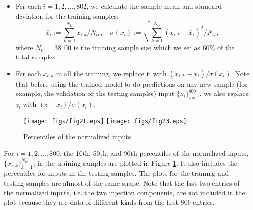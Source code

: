 \documentclass[thmsa,onecolumn,12pt]{article}%
\begin{document}
\begin{itemize}
\item For each $i=1,2,...,802$, we calculate the sample mean and standard deviation for the training samples:
\[\bar{x}_i:=\sum_{k=1}^{N_{tr}}x_{i,k}/{N_{tr}}, \quad \sigma(x_i):= \sqrt{\sum_{k=1}^{N_{tr}}(x_{i,k}-\bar{x}_i)^2/{N_{tr}}},\]
where $N_{tr}=38100$ is the training sample size which we set as $60\%$ of the total samples.
\item For each $x_{i,k}$ in all the training, we replace it with $(x_{i,k}-\bar{x}_i)/\sigma(x_i)$. Note that before using the trained model to do predictions on any new sample (for example, the validation or the testing samples)  input $\{z_i\}_{i=1}^{800}$, we also replace $z_i$ with $(z-\bar{x}_i)/\sigma(x_i)$.
\end{itemize}

\begin{figure}[!b]
	\centering
		\texttt{[image: figs/fig21.eps]}
		\texttt{[image: figs/fig23.eps]}

\caption{Percentiles of the normalized inputs}
\label{normalized-inputs}
\end{figure}

For $i=1,2,...,800$, the 10th, 50th, and 90th percentiles of the normalized inputs, $\{x_{i,k} \}_{k=1}^{N_{tr}}$, in the training samples are plotted in Figure \ref{normalized-inputs}. It also includes the percentiles for inputs in the testing samples. The plots for the training and testing samples are almost of the same shape. Note that the last two entries of the normalized inputs, i.e. the two injection components, are not included in the plot because they are data of different kinds from the first 800 entries.
\end{document}
